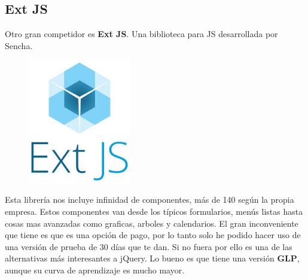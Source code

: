 \documentclass[12pt,a4paper]{article}
\begin{document}
\subsection{Ext JS}
Otro gran competidor es \textbf{Ext JS}. Una biblioteca para JS desarrollada por Sencha. 
\begin{figure}[H]
	\centering
	\includegraphics[width=0.4\textwidth]{images/extjs.jpeg}
\end{figure}
Esta librería nos incluye infinidad de componentes, más de 140 según la propia empresa. Estos componentes van desde los típicos formularios, menús listas hasta cosas mas avanzadas como graficas, arboles y calendarios. El gran inconveniente que tiene es que es una opción de pago, por lo tanto solo he podido hacer uso de una versión de prueba de 30 días que te dan. Si no fuera por ello es una de las alternativas más interesantes a jQuery.  Lo bueno es que tiene una versión \textbf{GLP}, aunque su curva de aprendizaje es mucho mayor.
\end{document}
